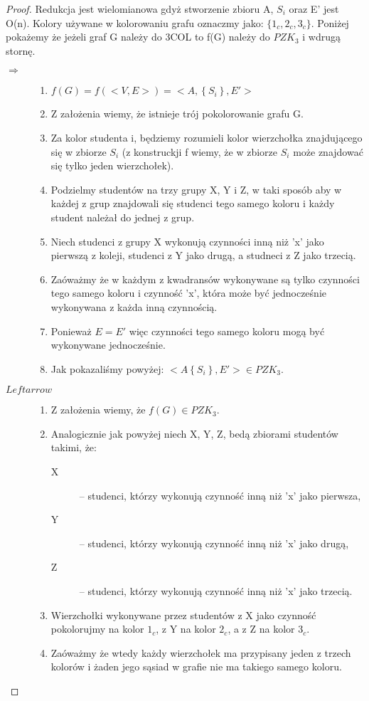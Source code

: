 \documentclass[svgnames]{report}
\begin{document}
\begin{proof}
	Redukcja jest wielomianowa gdyż stworzenie zbioru A, $S_i$ oraz E' jest O(n).
	Kolory używane w kolorowaniu grafu oznaczmy jako: $\{1_c, 2_c, 3_c\}$.
	Poniżej pokażemy że jeżeli graf G należy do 3COL to f(G) należy do $PZK_3$ i wdrugą stornę.
	\begin{description}
		\item[$\Rightarrow$]
			\begin{enumerate}
				\item $f(G) = f(<V, E>) = <A, \left\{S_i\right\}, E'>$
				\item Z założenia wiemy, że istnieje trój pokolorowanie grafu G.
				\item Za kolor studenta i, będziemy rozumieli kolor wierzchołka znajdującego się w zbiorze $S_i$ (z konstruckji f wiemy, że w zbiorze $S_i$ może znajdować się tylko jeden wierzchołek). 
				\item Podzielmy studentów na trzy grupy X, Y i Z, w taki sposób aby w każdej z grup znajdowali się studenci tego samego koloru i każdy student należał do jednej z grup.
				\item Niech studenci z grupy X wykonują czynności inną niż 'x' jako pierwszą z koleji, studenci z Y jako drugą, a studneci z Z jako trzecią.
				\item Zaóważmy że w każdym z kwadransów wykonywane są tylko czynności tego samego koloru i czynność 'x', która może być jednocześnie wykonywana z każda inną czynnością.
				\item Ponieważ $E = E'$ więc czynności tego samego koloru mogą być wykonywane jednocześnie.
				\item Jak pokazaliśmy powyżej: $<A \left\{S_i\right\}, E'> \in PZK_3$.
			\end{enumerate}
		\item[$Leftarrow$]
			\begin{enumerate}
				\item Z założenia wiemy, że $f(G) \in PZK_3$.
				\item Analogicznie jak powyżej niech X, Y, Z, bedą zbiorami studentów takimi, że:
					\begin{description}
						\item[X] -- studenci, którzy wykonują czynność inną niż 'x' jako pierwsza,
						\item[Y] -- studenci, którzy wykonują czynność inną niż 'x' jako drugą,
						\item[Z] -- studenci, którzy wykonują czynność inną niż 'x' jako trzecią.
					\end{description}
				\item Wierzchołki wykonywane przez studentów z X jako czynność pokolorujmy na kolor $1_c$, z Y na kolor $2_c$,  a z Z na kolor $3_c$.
				\item Zaóważmy że wtedy każdy wierzchołek ma przypisany jeden z trzech kolorów i żaden jego sąsiad w grafie nie ma takiego samego koloru.				
			\end{enumerate}
	\end{description}
\end{proof}
\end{document}

